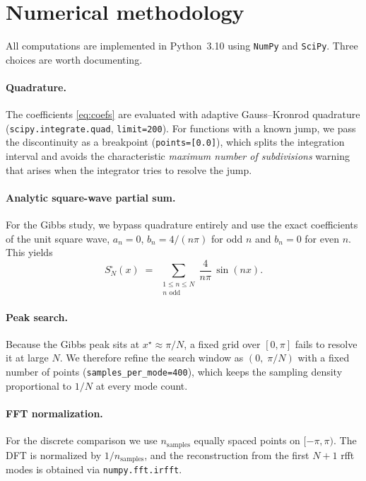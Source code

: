 \documentclass[11pt,a4paper]{article}
\begin{document}
\section{Numerical methodology}
\label{sec:method}

All computations are implemented in Python~3.10 using \texttt{NumPy} and
\texttt{SciPy}. Three choices are worth documenting.

\paragraph{Quadrature.}
The coefficients \eqref{eq:coefs} are evaluated with adaptive Gauss--Kronrod
quadrature (\texttt{scipy.integrate.quad}, \texttt{limit=200}). For functions
with a known jump, we pass the discontinuity as a breakpoint
(\texttt{points=[0.0]}), which splits the integration interval and avoids the
characteristic \emph{maximum number of subdivisions} warning that arises
when the integrator tries to resolve the jump.

\paragraph{Analytic square-wave partial sum.}
For the Gibbs study, we bypass quadrature entirely and use the exact
coefficients of the unit square wave, $a_n = 0$,
$b_n = 4/(n\pi)$ for odd $n$ and $b_n = 0$ for even $n$. This yields
\begin{equation}
S_N^{\square}(x) \;=\; \sum_{\substack{1 \le n \le N \\ n \text{ odd}}}
    \frac{4}{n\pi}\,\sin(nx).
\label{eq:swn}
\end{equation}

\paragraph{Peak search.}
Because the Gibbs peak sits at $x^\star \approx \pi/N$, a fixed grid over
$[0,\pi]$ fails to resolve it at large $N$. We therefore refine the search
window as $(0,\;\pi/N)$ with a fixed number of points
(\texttt{samples\_per\_mode=400}), which keeps the sampling density
proportional to $1/N$ at every mode count.

\paragraph{FFT normalization.}
For the discrete comparison we use $n_{\text{samples}}$ equally spaced points
on $[-\pi,\pi)$. The DFT is normalized by $1/n_{\text{samples}}$, and the
reconstruction from the first $N+1$ rfft modes is obtained via
\texttt{numpy.fft.irfft}.
\end{document}
